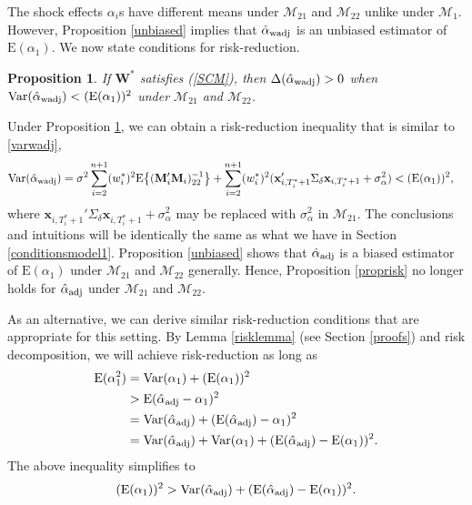 \documentclass[11pt,3p,review,authoryear]{elsarticle}
\def\mbf#1{\mathbf{#1}} %
\def\mrm#1{\mathrm{#1}} %
\def\mc#1{\mathcal{#1}} %
\def\E#1{\mathrm{E}(#1)} %
\def\var#1{\mathrm{Var}(#1)} %
\newtheorem{prop}{Proposition}
\theoremstyle{definition}
\begin{document}
The shock effects $\alpha_i$s have different means under $\mc{M}_{21}$ and $\mc{M}_{22}$ unlike under $\mc{M}_1$. However, Proposition \ref{unbiased} implies that $\hat{\alpha}_{\rm wadj}$ is an unbiased estimator of $\E{\alpha_1}$. We now state conditions for risk-reduction.

\begin{prop}
\label{propriskwadj2} If $\mbf{W}^*$ satisfies (\ref{SCM}), then $\Delta(\hat\alpha_{\rm wadj}) > 0$ when $\var{\hat{\alpha}_{\rm wadj}}<(\E{\alpha_1})^2$  under $\mc{M}_{21}$ and $\mc{M}_{22}$. 
\end{prop}
Under Proposition \ref{propriskwadj2}, we can obtain a risk-reduction inequality that is similar to \eqref{varwadj},
\begin{align*}
\var{\hat{\alpha}_{\rm wadj}}
& = \sigma^2\sum_{i=2}^{n+1}(w_i^*)^2\mrm{E}\big\{(\mbf{M}'_i\mbf{M}_i)^{-1}_{22}\big\} + \sum_{i=2}^{n+1} (w_i^*)^2 (\mbf{x}_{i, T_i^*+1}'\Sigma_{\delta}\mbf{x}_{i, T_i^*+1} + \sigma^2_{\alpha}) < (\E{\alpha_1})^2,
\end{align*}
where $\mbf{x}_{i, T_i^*+1}'\Sigma_{\delta}\mbf{x}_{i, T_i^*+1} + \sigma^2_{\alpha}$ may be replaced with $\sigma^2_{\alpha}$ in $\mc{M}_{21}$. The conclusions and intuitions will be identically the same as what we have in Section \ref{conditionsmodel1}. Proposition \ref{unbiased} shows that $\hat{\alpha}_{\rm adj}$ is a biased estimator of $\E{\alpha_1}$ under $\mc{M}_{21}$ and $\mc{M}_{22}$ generally. Hence, Proposition \ref{proprisk} no longer holds for $\hat{\alpha}_{\rm adj}$ under $\mc{M}_{21}$ and $\mc{M}_{22}$.

As an alternative, we can derive similar risk-reduction conditions that are appropriate for this setting. By Lemma \ref{risklemma} (see Section \ref{proofs}) and risk decomposition, we will achieve risk-reduction as long as
\begin{align*}
 \E{\alpha_1^2} &= \var{\alpha_1}+(\E{\alpha_1})^2\\
 &>\E{\hat{\alpha}_{\rm adj}-\alpha_1}^2\\
  &=\var{\hat{\alpha}_{\rm adj}} +  (\E{\hat{\alpha}_{\rm adj}}-\alpha_1)^2 \\
  &=\var{\hat{\alpha}_{\rm adj}} +  \var{\alpha_1} + (\E{\hat{\alpha}_{\rm adj}}-\E{\alpha_1})^2.
\end{align*}
The above inequality simplifies to 
\begin{equation} \label{ineq}
 (\E{\alpha_1})^2 >\var{\hat{\alpha}_{\rm adj}}+ (\E{\hat{\alpha}_{\rm adj}}-\E{\alpha_1})^2.
\end{equation}
\end{document}
